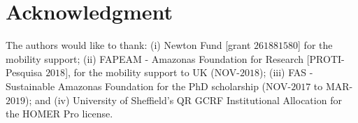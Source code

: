 \documentclass[journal]{IEEEtran}
\begin{document}



%


\section*{Acknowledgment}

The authors would like to thank: (i) Newton Fund [grant $261881580$] for the mobility support; (ii) FAPEAM - Amazonas Foundation for Research [PROTI-Pesquisa $2018$], for the mobility support to UK (NOV-$2018$); (iii) FAS - Sustainable Amazonas Foundation for the PhD scholarship (NOV-$2017$ to MAR-$2019$); and (iv) University of Sheffield's QR GCRF Institutional Allocation for the HOMER Pro license.

\ifCLASSOPTIONcaptionsoff
  \newpage
\fi
\end{document}

